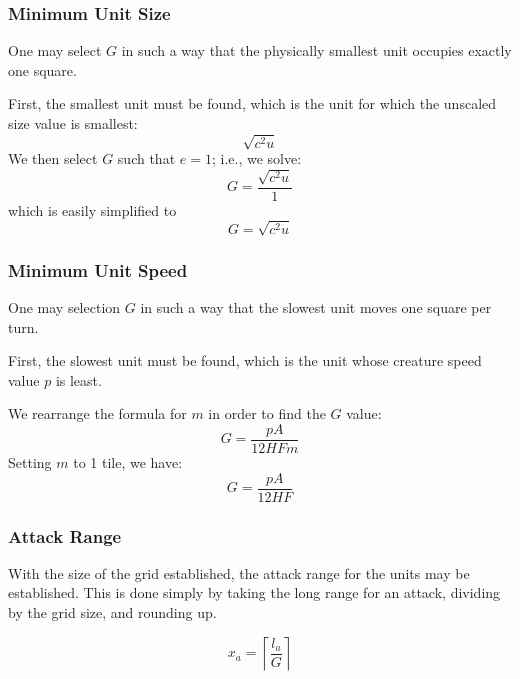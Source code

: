 \subsubsection{Minimum Unit Size}

One may select $G$ in such a way that the physically smallest unit
occupies exactly one square.

First, the smallest unit must be found,
which is the unit for which the unscaled size value is smallest:
\[
    \sqrt{c^2 u}
\]
We then select $G$ such that $e = 1$;
i.e., we solve:
\[
    G = \frac
            {\sqrt{c^2 u}}
            {1}
\]
which is easily simplified to
\[
    G = \sqrt{c^2 u}
\]

\subsubsection{Minimum Unit Speed}

One may selection $G$ in such a way that the slowest unit moves one square per turn.

First, the slowest unit must be found,
which is the unit whose creature speed value $p$ is least.

We rearrange the formula for $m$ in order to find the $G$ value:
\[
    G = \frac
            {p A}
            {12 H F m}
\]
Setting $m$ to 1 tile, we have:
\[
    G = \frac
            {p A}
            {12 H F}
\]

\subsubsection{Attack Range}

With the size of the grid established, the attack range for the units may be established.
This is done simply by taking the long range for an attack,
dividing by the grid size,
and rounding up.

\[
    x_a = \left\lceil\frac
        {l_a}
        {G}
        \right\rceil
\]

